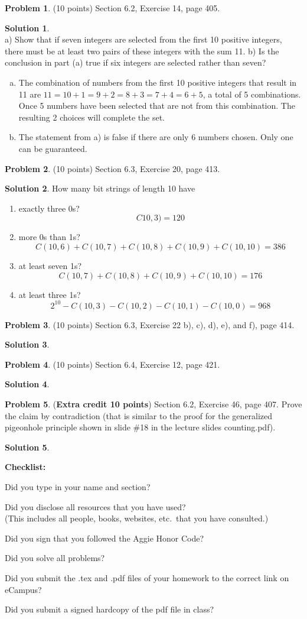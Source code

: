 \documentclass{article}
\theoremstyle{definition}
\newtheorem{problem}{Problem}
\newtheorem*{solution}{Solution}
\newcommand{\checklist}{\noindent\textbf{Checklist:}
\begin{compactitem}[$\Box$] 
\item Did you type in your name and section? 
\item Did you disclose all resources that you have used? \\
(This includes all people, books, websites, etc.\ that you have consulted.)
\item Did you sign that you followed the Aggie Honor Code? 
\item Did you solve all problems? 
\item Did you submit the .tex and .pdf files of your homework to the correct link on eCampus?
\item Did you submit a signed hardcopy of the pdf file in class? 
\end{compactitem}
}
\begin{document}
\begin{problem} (10 points) 
Section 6.2, Exercise 14, page 405.
\end{problem}
\begin{solution}\ \\
a) Show that if seven integers are selected from the first
10 positive integers, there must be at least two pairs
of these integers with the sum 11.
b) Is the conclusion in part (a) true if six integers are
selected rather than seven?
\begin{enumerate}[a)]
  \item The combination of numbers from the first 10 positive integers that result in 11 are $11 = 10+1=9+2=8+3=7+4=6+5$, a total of 5 combinations. Once 5 numbers have been selected that are not from this combination. The resulting 2 choices will complete the set.
  \item The statement from a) is false if there are only 6 numbers chosen. Only one can be guaranteed.
\end{enumerate}
\end{solution}

\begin{problem} (10 points) 
Section 6.3, Exercise 20, page 413.
\end{problem}
\begin{solution} 
How many bit strings of length 10 have
\begin{enumerate}
  \item exactly three 0s?
  $$C10,3) = 120$$
  \item more 0s than 1s?
  $$C(10,6) + C(10,7) + C(10,8) + C(10,9) + C(10,10) = 386$$
  \item at least seven 1s?
  $$C(10,7) + C(10,8) + C(10,9) + C(10,10) = 176$$
  \item at least three 1s?
  $$2^{10} - C(10,3) - C(10,2) - C(10,1) - C(10,0) = 968$$
\end{enumerate}
\end{solution}

\begin{problem} (10 points) 
Section 6.3, Exercise 22 b), c), d), e), and f), page 414.
\end{problem}
\begin{solution} 
\end{solution}

\begin{problem} (10 points) 
Section 6.4, Exercise 12, page 421.
\end{problem}
\begin{solution} 
\end{solution}

\begin{problem} (\textbf{Extra credit 10 points})
Section 6.2, Exercise 46, page 407.  Prove the claim by contradiction 
(that is similar to the proof for the generalized pigeonhole principle shown 
in slide \#18 in the lecture slides counting.pdf).
\end{problem}
\begin{solution} 
\end{solution}

\goodbreak
\checklist
\end{document}
